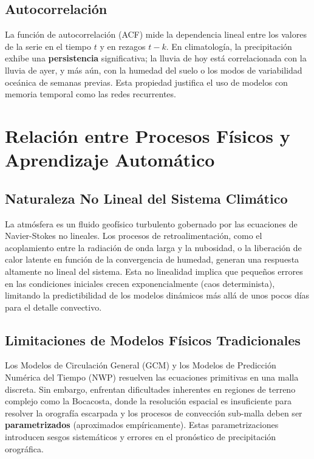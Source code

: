 \documentclass[titlepage,11pt]{report}
\begin{document}
\subsection{Autocorrelación}
La función de autocorrelación (ACF) mide la dependencia lineal entre los valores de la serie en el tiempo \(t\) y en rezagos \(t-k\). En climatología, la precipitación exhibe una \textbf{persistencia} significativa; la lluvia de hoy está correlacionada con la lluvia de ayer, y más aún, con la humedad del suelo o los modos de variabilidad oceánica de semanas previas. Esta propiedad justifica el uso de modelos con memoria temporal como las redes recurrentes.

\section{Relación entre Procesos Físicos y Aprendizaje Automático}

\subsection{Naturaleza No Lineal del Sistema Climático}
La atmósfera es un fluido geofísico turbulento gobernado por las ecuaciones de Navier-Stokes no lineales. Los procesos de retroalimentación, como el acoplamiento entre la radiación de onda larga y la nubosidad, o la liberación de calor latente en función de la convergencia de humedad, generan una respuesta altamente no lineal del sistema. Esta no linealidad implica que pequeños errores en las condiciones iniciales crecen exponencialmente (caos determinista), limitando la predictibilidad de los modelos dinámicos más allá de unos pocos días para el detalle convectivo.

\subsection{Limitaciones de Modelos Físicos Tradicionales}
Los Modelos de Circulación General (GCM) y los Modelos de Predicción Numérica del Tiempo (NWP) resuelven las ecuaciones primitivas en una malla discreta. Sin embargo, enfrentan dificultades inherentes en regiones de terreno complejo como la Bocacosta, donde la resolución espacial es insuficiente para resolver la orografía escarpada y los procesos de convección sub-malla deben ser \textbf{parametrizados} (aproximados empíricamente). Estas parametrizaciones introducen sesgos sistemáticos y errores en el pronóstico de precipitación orográfica.
\end{document}
